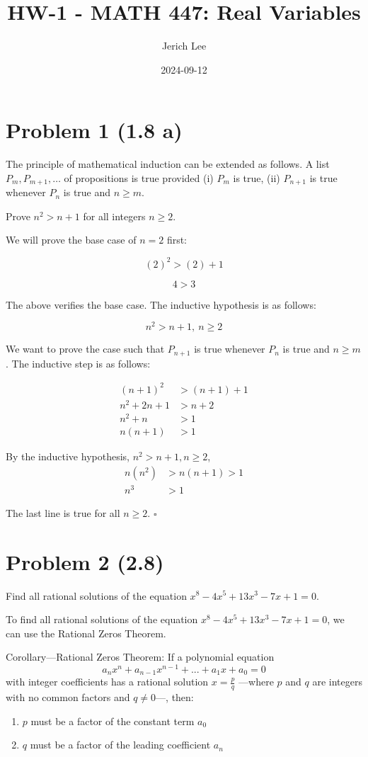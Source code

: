 \documentclass{article}
\title{HW-1 - MATH 447: Real Variables}
\author{Jerich Lee}
\date{2024-09-12}
\begin{document}
\maketitle

\section*{Problem 1 (1.8 a)}
The principle of mathematical induction can be extended as follows. A list $P_{m}, P_{m+1}, \dots$ of propositions is true provided (i) $P_{m}$ is true, (ii) $P_{n+1}$ is true whenever $P_{n}$ is true and $n\geq m$.

Prove $n^2>n+1$ for all integers $n\geq2$.

We will prove the base case of $n=2$ first:

$$
(2)^2>(2)+1
$$

$$
4>3
$$

The above verifies the base case. The inductive hypothesis is as follows:

$$
n^2>n+1, \ n\geq 2
$$

We want to prove the case such that $P_{n+1}$ is true whenever $P_{n}$ is true and $n\geq m$. The inductive step is as follows:

\begin{align}
(n+1)^2 &> (n+1)+1 \\
n^2+2n+1 &> n+2 \\
n^2+n &> 1 \\
n(n+1) &> 1
\end{align}

By the inductive hypothesis, $n^2>n+1, n\geq 2$,
\begin{align}
n(n^2) &> n(n+1) > 1 \\
n^3 &> 1
\end{align}

The last line is true for all $n\geq 2$.  $\square$

\section*{Problem 2 (2.8)}
Find all rational solutions of the equation $x^8-4x^5+13x^3-7x+1=0$.

To find all rational solutions of the equation $x^8-4x^5+13x^3-7x+1=0$, we can use the Rational Zeros Theorem.

Corollary—Rational Zeros Theorem: If a polynomial equation 
$$
a_nx^n + a_{n-1}x^{n-1} + ... + a_1x + a_0 = 0
$$
with integer coefficients has a rational solution $x = \frac{p}{q}$ 
—where $p$ and $q$ are integers with no common factors and $q \neq 0$—, then:
\begin{enumerate}
    \item $p$ must be a factor of the constant term $a_0$
    \item $q$ must be a factor of the leading coefficient $a_n$
\end{enumerate}
\end{document}
